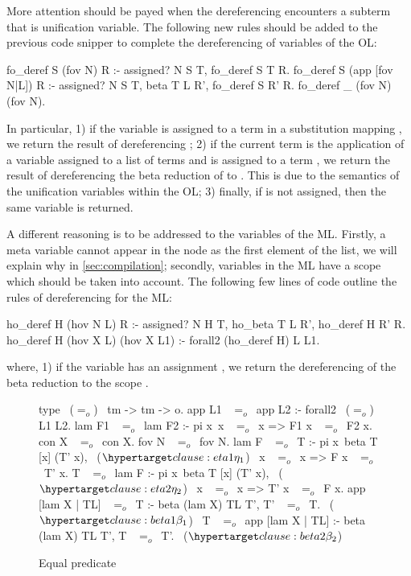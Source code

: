 \documentclass[sigconf,natbib=false]{acmart}
\newcommand{\EqualRel}{\ensuremath{=}}
\newcommand{\Eo}{\ensuremath{\EqualRel_o}\xspace}
\begin{document}
More attention should be payed when the dereferencing encounters a subterm that
is unification variable. The following new rules should be added to the previous
code snipper to complete the dereferencing of variables of the OL:

\begin{elpicode}
  fo_deref S (fov N) R :- assigned? N S T, fo_deref S T R.
  fo_deref S (app [fov N|L]) R :- 
    assigned? N S T, beta T L R', fo_deref S R' R.
  fo_deref _ (fov N) (fov N).
\end{elpicode}

In particular, 1) if the variable  is assigned to a term
 in a substitution mapping , we return the result of
dereferencing ; 2) if the current term is the application of a
variable  assigned to a list of terms  and 
is assigned to a term , we return the result of dereferencing the beta
reduction of  to . This is due to the semantics of the
unification variables within the OL; 3) finally, if  is not
assigned, then the same variable is returned.

A different reasoning is to be addressed to the variables of the ML. Firstly, a
meta variable cannot appear in the  node as the first element of the
list, we will explain why in \cref{sec:compilation}; secondly, variables in the
ML have a scope which should be taken into account. The following few lines of
code outline the rules of dereferencing for the ML:

\begin{elpicode}
  ho_deref H (hov N L) R :- assigned? N H T, 
    ho_beta T L R', ho_deref H R' R.
  ho_deref H (hov X L) (hov X L1) :- 
    forall2 (ho_deref H) L L1.
\end{elpicode}

\noindent
where, 1) if the variable  has an assignment , we
return the dereferencing of the beta reduction  to the scope
.

\begin{figure}
  \begin{elpicode}
    type ~(\Eo)~ tm -> tm -> o.
    app L1 ~\Eo~app L2 :- forall2 ~(\Eo)~ L1 L2.
    lam F1 ~\Eo~lam F2 :- pi x\ x ~\Eo~x => F1 x ~\Eo~F2 x.
    con X ~\Eo~con X.
    fov N ~\Eo~fov N.
    lam F ~\Eo~T :- pi x\ beta T [x] (T' x),                 ~($\customlabel{clause:eta1}{\eta_1}$)~
      x ~\Eo~x => F x ~\Eo~T' x.
    T ~\Eo~lam F :- pi x\ beta T [x] (T' x),                 ~($\customlabel{clause:eta2}{\eta_2}$)~
      x ~\Eo~x => T' x ~\Eo~F x.
    app [lam X | TL] ~\Eo~T :- beta (lam X) TL T', T' ~\Eo~T. ~($\customlabel{clause:beta1}{\beta_1}$)~
    T ~\Eo~app [lam X | TL] :- beta (lam X) TL T', T ~\Eo~T'. ~($\customlabel{clause:beta2}{\beta_2}$)~
  \end{elpicode}
  \caption{Equal predicate}
  \label{code:eq-pred}
\end{figure}
\end{document}
